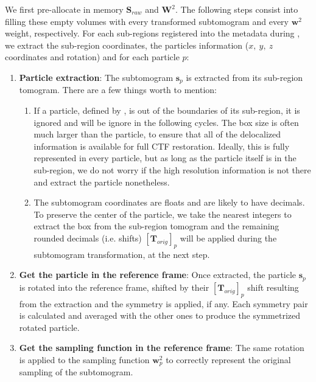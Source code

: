 We first pre-allocate in memory $\bm{S}_{raw}$ and $\bm{W}^2$. The following steps consist into filling these empty volumes with every transformed subtomogram and every $\bm{w}^2$ weight, respectively. For each sub-regions registered into the metadata during , we extract the sub-region coordinates, the particles information ($x,\ y,\ z$ coordinates and rotation) and for each particle $p$:
\begin{enumerate}
    \item \textbf{Particle extraction}: The subtomogram $\bm{s}_{p}$ is extracted from its sub-region tomogram. There are a few things worth to mention:
    \begin{enumerate}
        \item If a particle, defined by , is out of the boundaries of its sub-region, it is ignored and will be ignore in the following cycles. The box size is often much larger than the particle, to ensure that all of the delocalized information is available for full CTF restoration. Ideally, this is fully represented in every particle, but as long as the particle itself is in the sub-region, we do not worry if the high resolution information is not there and extract the particle nonetheless.
        \item The subtomogram coordinates are floats and are likely to have decimals. To preserve the center of the particle, we take the nearest integers to extract the box from the sub-region tomogram and the remaining rounded decimals (i.e. shifts) ${[\bm{T}_{orig}]}_p$ will be applied during the subtomogram transformation, at the next step.
    \end{enumerate}
    \item \textbf{Get the particle in the reference frame}: Once extracted, the particle $\bm{s}_{p}$ is rotated into the reference frame, shifted by their ${[\bm{T}_{orig}]}_p$ shift resulting from the extraction and the symmetry is applied, if any. Each symmetry pair is calculated and averaged with the other ones to produce the symmetrized rotated particle.

    \item \textbf{Get the sampling function in the reference frame}: The same rotation is applied to the sampling function $\bm{w}_{p}^2$ to correctly represent the original sampling of the subtomogram.


\end{enumerate}
